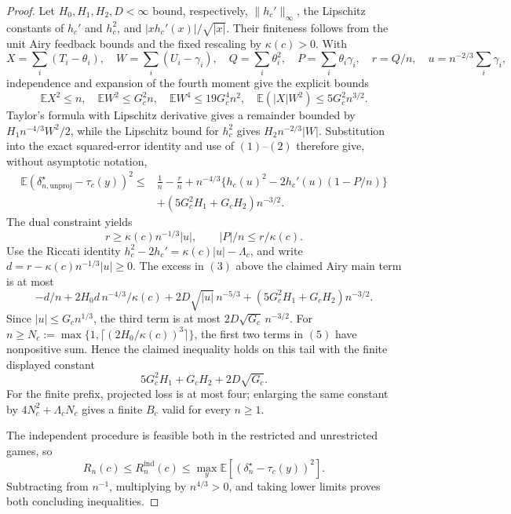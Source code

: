 \documentclass{article}
\begin{document}
{\begin{proof}
Let \(H_0,H_1,H_2,D<\infty\) bound, respectively,
\(\|h_c'\|_\infty\), the Lipschitz constants of \(h_c'\) and \(h_c^2\), and
\(|xh_c'(x)|/\sqrt{|x|}\).  Their finiteness follows from the unit Airy feedback bounds and the fixed rescaling by \(\kappa(c)>0\).  With
\[
X=\sum_i(T_i-\theta_i),\quad W=\sum_i(U_i-\gamma_i),
\quad Q=\sum_i\theta_i^2,\quad P=\sum_i\theta_i\gamma_i,
\quad r=Q/n,\quad u=n^{-2/3}\sum_i\gamma_i,
\]
independence and expansion of the fourth moment give the explicit bounds
\[
\mathbb EX^2\le n,\quad \mathbb EW^2\le G_c^2n,\quad
\mathbb EW^4\le19G_c^4n^2,\quad
\mathbb E(|X|W^2)\le5G_c^2n^{3/2}.
\tag{2}
\]
Taylor's formula with Lipschitz derivative gives a remainder bounded by
\(H_1n^{-4/3}W^2/2\), while the Lipschitz bound for \(h_c^2\) gives
\(H_2n^{-2/3}|W|\).  Substitution into the exact squared-error identity and use of \((1)\)--\((2)\) therefore give, without asymptotic notation,
\[
\begin{aligned}
\mathbb E(\delta_{n,\mathrm{unproj}}^\star-\tau_c(y))^2
\le{}&\frac1n-\frac rn+n^{-4/3}
\{h_c(u)^2-2h_c'(u)(1-P/n)\}\\
&+(5G_c^2H_1+G_cH_2)n^{-3/2}.
\end{aligned}
\tag{3}
\]
The dual constraint yields
\[
r\ge\kappa(c)n^{-1/3}|u|,\qquad |P|/n\le r/\kappa(c).
\tag{4}
\]
Use the Riccati identity
\(h_c^2-2h_c'=\kappa(c)|u|-\Lambda_c\), and write
\(d=r-\kappa(c)n^{-1/3}|u|\ge0\).  The excess in \((3)\) above the claimed Airy main term is at most
\[
-d/n+2H_0d\,n^{-4/3}/\kappa(c)
+2D\sqrt{|u|}\,n^{-5/3}
+(5G_c^2H_1+G_cH_2)n^{-3/2}.
\tag{5}
\]
Since \(|u|\le G_cn^{1/3}\), the third term is at most
\(2D\sqrt{G_c}\,n^{-3/2}\).  For
\(n\ge N_c:=\max\{1,\lceil(2H_0/\kappa(c))^3\rceil\}\), the first two terms in \((5)\) have nonpositive sum.  Hence the claimed inequality holds on this tail with the finite displayed constant
\[
5G_c^2H_1+G_cH_2+2D\sqrt{G_c}.
\]
For the finite prefix, projected loss is at most four; enlarging the same constant by
\(4N_c^2+\Lambda_cN_c\) gives a finite \(B_c\) valid for every \(n\ge1\).

The independent procedure is feasible both in the restricted and unrestricted games, so
\[
R_n(c)\le R_n^{\mathrm{ind}}(c)
\le\max_y\mathbb E[(\delta_n^\star-\tau_c(y))^2].
\]
Subtracting from \(n^{-1}\), multiplying by \(n^{4/3}>0\), and taking lower limits proves both concluding inequalities.
\end{proof}

}
\end{document}
